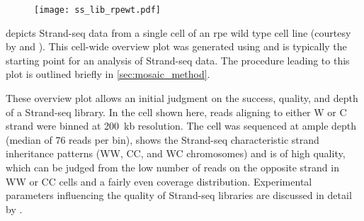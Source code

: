     \begin{figure}[t!]                                             %
        \captionsetup{type=figure}
        \texttt{[image: ss\_lib\_rpewt.pdf]}
    \end{figure}

 depicts Strand-seq data from a single cell of an \acf{rpe}
wild type cell line (courtesy by \balca and \landsdorp). This cell-wide overview
plot was generated using \mc and is typically the starting point for
an analysis of Strand-seq data. The procedure leading to this plot is outlined
briefly in \cref{sec:mosaic_method}.

These overview plot allows an initial judgment on the success, quality, and depth
of a Strand-seq library. In the cell shown here, reads aligning to either W or C
strand were binned at 200~kb resolution. The cell was sequenced at ample depth
(median of 76 reads per bin), shows the Strand-seq characteristic strand
inheritance patterns (WW, CC, and WC chromosomes) and is of high quality, which
can be judged from the low number of reads on the opposite strand in WW or CC
cells and a fairly even coverage distribution. Experimental parameters
influencing the quality of Strand-seq libraries are discussed in detail by
\citet{Sanders2017}.

